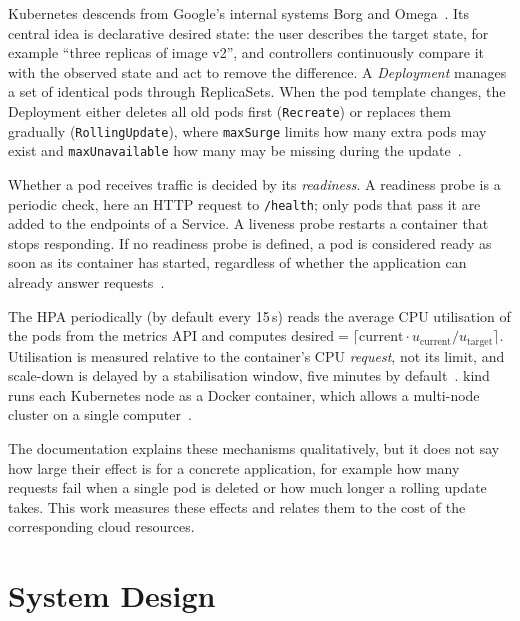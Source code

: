 \documentclass[conference,a4paper]{IEEEtran}
\begin{document}
Kubernetes descends from Google's internal systems Borg and Omega~\cite{borg}. Its central idea is declarative desired state: the user describes the target state, for example ``three replicas of image v2'', and controllers continuously compare it with the observed state and act to remove the difference. A \emph{Deployment} manages a set of identical pods through ReplicaSets. When the pod template changes, the Deployment either deletes all old pods first (\texttt{Recreate}) or replaces them gradually (\texttt{RollingUpdate}), where \texttt{maxSurge} limits how many extra pods may exist and \texttt{maxUnavailable} how many may be missing during the update~\cite{k8sdeploy}.

Whether a pod receives traffic is decided by its \emph{readiness}. A readiness probe is a periodic check, here an HTTP request to \texttt{/health}; only pods that pass it are added to the endpoints of a Service. A liveness probe restarts a container that stops responding. If no readiness probe is defined, a pod is considered ready as soon as its container has started, regardless of whether the application can already answer requests~\cite{k8sprobes}.

The HPA periodically (by default every 15\,s) reads the average CPU utilisation of the pods from the metrics API and computes $\text{desired} = \lceil \text{current} \cdot u_{\text{current}} / u_{\text{target}} \rceil$. Utilisation is measured relative to the container's CPU \emph{request}, not its limit, and scale-down is delayed by a stabilisation window, five minutes by default~\cite{k8shpa}. kind runs each Kubernetes node as a Docker container, which allows a multi-node cluster on a single computer~\cite{kind}.

The documentation explains these mechanisms qualitatively, but it does not say how large their effect is for a concrete application, for example how many requests fail when a single pod is deleted or how much longer a rolling update takes. This work measures these effects and relates them to the cost of the corresponding cloud resources.

\section{System Design}
\label{sec:design}
\end{document}
